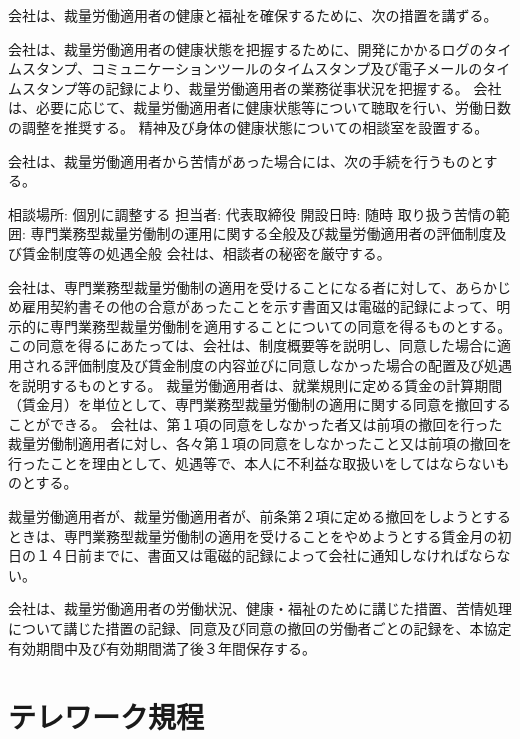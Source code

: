 \documentclass[10pt,a4paper,uplatex]{jsarticle}
\begin{document}
会社は、裁量労働適用者の健康と福祉を確保するために、次の措置を講ずる。
\begin{enumerate}
    \itm 会社は、裁量労働適用者の健康状態を把握するために、開発にかかるログのタイムスタンプ、コミュニケーションツールのタイムスタンプ及び電子メールのタイムスタンプ等の記録により、裁量労働適用者の業務従事状況を把握する。
    \itm 会社は、必要に応じて、裁量労働適用者に健康状態等について聴取を行い、労働日数の調整を推奨する。
    \itm 精神及び身体の健康状態についての相談室を設置する。
\end{enumerate}

会社は、裁量労働適用者から苦情があった場合には、次の手続を行うものとする。
\begin{enumerate}
    \itm 相談場所: 個別に調整する
    \itm 担当者: 代表取締役
    \itm 開設日時: 随時
    \itm 取り扱う苦情の範囲: 専門業務型裁量労働制の運用に関する全般及び裁量労働適用者の評価制度及び賃金制度等の処遇全般
    \itm 会社は、相談者の秘密を厳守する。
\end{enumerate}

会社は、専門業務型裁量労働制の適用を受けることになる者に対して、あらかじめ雇用契約書その他の合意があったことを示す書面又は電磁的記録によって、明示的に専門業務型裁量労働制を適用することについての同意を得るものとする。この同意を得るにあたっては、会社は、制度概要等を説明し、同意した場合に適用される評価制度及び賃金制度の内容並びに同意しなかった場合の配置及び処遇を説明するものとする。
\term 裁量労働適用者は、就業規則に定める賃金の計算期間（賃金月）を単位として、専門業務型裁量労働制の適用に関する同意を撤回することができる。
\term 会社は、第１項の同意をしなかった者又は前項の撤回を行った裁量労働制適用者に対し、各々第１項の同意をしなかったこと又は前項の撤回を行ったことを理由として、処遇等で、本人に不利益な取扱いをしてはならないものとする。

裁量労働適用者が、裁量労働適用者が、前条第２項に定める撤回をしようとするときは、専門業務型裁量労働制の適用を受けることをやめようとする賃金月の初日の１４日前までに、書面又は電磁的記録によって会社に通知しなければならない。

会社は、裁量労働適用者の労働状況、健康・福祉のために講じた措置、苦情処理について講じた措置の記録、同意及び同意の撤回の労働者ごとの記録を、本協定有効期間中及び有効期間満了後３年間保存する。

\clearpage
\section{テレワーク規程}
\end{document}
